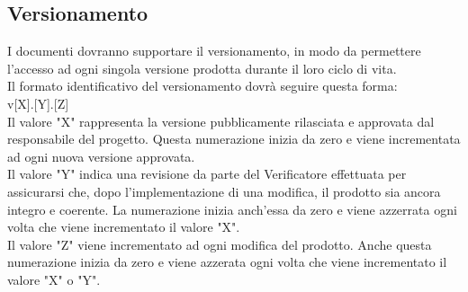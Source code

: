 \subsection{Versionamento}
I documenti dovranno supportare il versionamento, in modo da permettere l’accesso ad ogni singola versione prodotta durante il loro ciclo di vita. \\
Il formato identificativo del versionamento dovrà seguire questa forma: \\
v[X].[Y].[Z] \\
Il valore "X" rappresenta la versione pubblicamente rilasciata e approvata dal responsabile del progetto. Questa numerazione inizia da zero e viene incrementata ad ogni nuova versione approvata. \\
Il valore "Y" indica una revisione da parte del Verificatore effettuata per assicurarsi che, dopo l'implementazione di una modifica, il prodotto sia ancora integro e coerente. La numerazione inizia anch'essa da zero e viene azzerrata ogni volta che viene incrementato il valore "X". \\
Il valore "Z" viene incrementato ad ogni modifica del prodotto. Anche questa numerazione inizia da zero e viene azzerata ogni volta che viene incrementato il valore "X" o "Y". \\